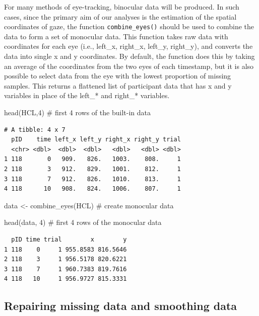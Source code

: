 \documentclass[
  man,
  floatsintext,
  longtable,
  nolmodern,
  notxfonts,
  notimes,
  colorlinks=true,linkcolor=blue,citecolor=blue,urlcolor=blue]{apa7}
\newenvironment{Shaded}{\begin{snugshade}}{\end{snugshade}}
\newcommand{\CommentTok}[1]{\textcolor[rgb]{0.37,0.37,0.37}{#1}}
\newcommand{\DecValTok}[1]{\textcolor[rgb]{0.68,0.00,0.00}{#1}}
\newcommand{\FunctionTok}[1]{\textcolor[rgb]{0.28,0.35,0.67}{#1}}
\newcommand{\NormalTok}[1]{\textcolor[rgb]{0.00,0.23,0.31}{#1}}
\newcommand{\OtherTok}[1]{\textcolor[rgb]{0.00,0.23,0.31}{#1}}
\begin{document}
For many methods of eye-tracking, binocular data will be produced. In
such cases, since the primary aim of our analyses is the estimation of
the spatial coordinates of gaze, the function \texttt{combine\_eyes()}
should be used to combine the data to form a set of monocular data. This
function takes raw data with coordinates for each eye (i.e., left\_x,
right\_x, left\_y, right\_y), and converts the data into single x and y
coordinates. By default, the function does this by taking an average of
the coordinates from the two eyes of each timestamp, but it is also
possible to select data from the eye with the lowest proportion of
missing samples. This returns a flattened list of participant data that
has x and y variables in place of the left\_* and right\_* variables.

\begin{Shaded}
\begin{Highlighting}[]
\FunctionTok{head}\NormalTok{(HCL,}\DecValTok{4}\NormalTok{) }\CommentTok{\# first 4 rows of the built{-}in data}
\end{Highlighting}
\end{Shaded}

\begin{verbatim}
# A tibble: 4 x 7
  pID    time left_x left_y right_x right_y trial
  <chr> <dbl>  <dbl>  <dbl>   <dbl>   <dbl> <dbl>
1 118       0   909.   826.   1003.    808.     1
2 118       3   912.   829.   1001.    812.     1
3 118       7   912.   826.   1010.    813.     1
4 118      10   908.   824.   1006.    807.     1
\end{verbatim}

\begin{Shaded}
\begin{Highlighting}[]
\NormalTok{data }\OtherTok{\textless{}{-}} \FunctionTok{combine\_eyes}\NormalTok{(HCL) }\CommentTok{\# create monocular data }

\FunctionTok{head}\NormalTok{(data, }\DecValTok{4}\NormalTok{) }\CommentTok{\# first 4 rows of the monocular data}
\end{Highlighting}
\end{Shaded}

\begin{verbatim}
  pID time trial        x        y
1 118    0     1 955.8583 816.5646
2 118    3     1 956.5178 820.6221
3 118    7     1 960.7383 819.7616
4 118   10     1 956.9727 815.3331
\end{verbatim}

\subsection{Repairing missing data and smoothing
data}\label{repairing-missing-data-and-smoothing-data}
\end{document}
